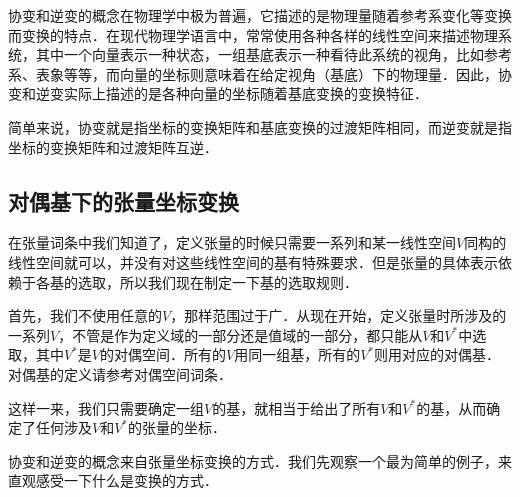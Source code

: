 


协变和逆变的概念在物理学中极为普遍，它描述的是物理量随着参考系变化等变换而变换的特点．在现代物理学语言中，常常使用各种各样的线性空间来描述物理系统，其中一个向量表示一种状态，一组基底表示一种看待此系统的视角，比如参考系、表象等等，而向量的坐标则意味着在给定视角（基底）下的物理量．因此，协变和逆变实际上描述的是各种向量的坐标随着基底变换的变换特征．

简单来说，协变就是指坐标的变换矩阵和基底变换的过渡矩阵相同，而逆变就是指坐标的变换矩阵和过渡矩阵互逆．

\subsection{对偶基下的张量坐标变换}

在张量词条中我们知道了，定义张量的时候只需要一系列和某一线性空间$V$同构的线性空间就可以，并没有对这些线性空间的基有特殊要求．但是张量的具体表示依赖于各基的选取，所以我们现在制定一下基的选取规则．

首先，我们不使用任意的$V$，那样范围过于广．从现在开始，定义张量时所涉及的一系列$V$，不管是作为定义域的一部分还是值域的一部分，都只能从$V$和$V^*$中选取，其中$V^*$是$V$的对偶空间．所有的$V$用同一组基，所有的$V^*$则用对应的对偶基．对偶基的定义请参考对偶空间词条．

这样一来，我们只需要确定一组$V$的基，就相当于给出了所有$V$和$V^*$的基，从而确定了任何涉及$V$和$V^*$的张量的坐标．



协变和逆变的概念来自张量坐标变换的方式．我们先观察一个最为简单的例子，来直观感受一下什么是变换的方式．

